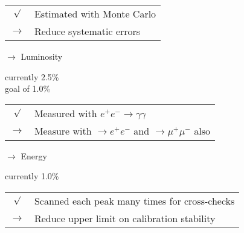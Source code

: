 \begin{slide*}
\begin{minipage}[t]{\linewidth}
\vspace{0.2 cm} \hspace{0.6 cm} \begin{tabular}{c l}
  $\surd$ & Estimated with Monte Carlo \\
  $\rightarrow$ & Reduce systematic errors
\end{tabular}

\vspace{0.9 cm}
$\rightarrow$ Luminosity
\vspace{-1.3 cm}
\begin{flushright}
  currently 2.5\% \\
  goal of 1.0\%
\end{flushright}

\vspace{0.2 cm} \hspace{0.6 cm} \begin{tabular}{c l}
  $\surd$ & Measured with $e^+e^- \to \gamma \gamma$ \\
  $\rightarrow$ & Measure with $\to e^+e^-$ and $\to \mu^+\mu^-$ also
\end{tabular}

\vspace{0.9 cm}
$\rightarrow$ Energy
\vspace{-0.9 cm}
\begin{flushright}
  currently 1.0\%
\end{flushright}

\vspace{0.2 cm} \hspace{0.6 cm} \begin{tabular}{c l}
  $\surd$ & Scanned each peak many times for cross-checks \\
  $\rightarrow$ & Reduce upper limit on calibration stability \\
\end{tabular}

\vspace{0.2 cm}

\end{minipage}
\end{slide*}


